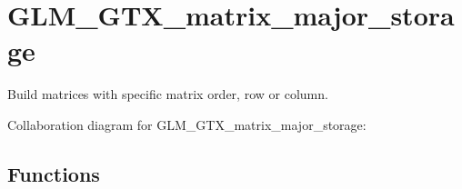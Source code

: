 \hypertarget{group__gtx__matrix__major__storage}{\section{G\-L\-M\-\_\-\-G\-T\-X\-\_\-matrix\-\_\-major\-\_\-storage}
\label{group__gtx__matrix__major__storage}
}


Build matrices with specific matrix order, row or column.  


Collaboration diagram for G\-L\-M\-\_\-\-G\-T\-X\-\_\-matrix\-\_\-major\-\_\-storage\-:
\subsection*{Functions}
